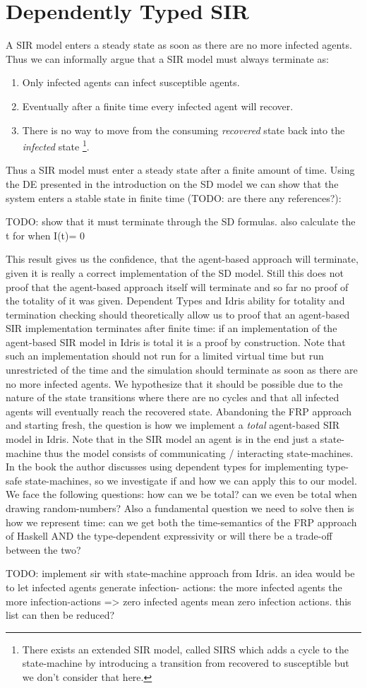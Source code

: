 \section{Dependently Typed SIR}
A SIR model enters a steady state as soon as there are no more infected agents. Thus we can informally argue that a SIR model must always terminate as:
\begin{enumerate}
	\item Only infected agents can infect susceptible agents.
	\item Eventually after a finite time every infected agent will recover.
	\item There is no way to move from the consuming \textit{recovered} state back into the \textit{infected} state \footnote{There exists an extended SIR model, called SIRS which adds a cycle to the state-machine by introducing a transition from recovered to susceptible but we don't consider that here.}.
\end{enumerate}

Thus a SIR model must enter a steady state after a finite amount of time. Using the DE presented in the introduction on the SD model we can show that the system enters a stable state in finite time (TODO: are there any references?):

TODO: show that it must terminate through the SD formulas. also calculate the t for when I(t)= 0

This result gives us the confidence, that the agent-based approach will terminate, given it is really a correct implementation of the SD model. Still this does not proof that the agent-based approach itself will terminate and so far no proof of the totality of it was given. Dependent Types and Idris ability for totality and termination checking should theoretically allow us to proof that an agent-based SIR implementation terminates after finite time: if an implementation of the agent-based SIR model in Idris is total it is a proof by construction. Note that such an implementation should not run for a limited virtual time but run unrestricted of the time and the simulation should terminate as soon as there are no more infected agents. We hypothesize that it should be possible due to the nature of the state transitions where there are no cycles and that all infected agents will eventually reach the recovered state. 
Abandoning the FRP approach and starting fresh, the question is how we implement a \textit{total} agent-based SIR model in Idris. Note that in the SIR model an agent is in the end just a state-machine thus the model consists of communicating / interacting state-machines. In the book \cite{brady_type-driven_2017} the author discusses using dependent types for implementing type-safe state-machines, so we investigate if and how we can apply this to our model. We face the following questions: how can we be total? can we even be total when drawing random-numbers? Also a fundamental question we need to solve then is how we represent time: can we get both the time-semantics of the FRP approach of Haskell AND the type-dependent expressivity or will there be a trade-off between the two?

TODO: implement sir with state-machine approach from Idris. an idea would be to let infected agents generate infection- actions: the more infected agents the more infection-actions => zero infected agents mean zero infection actions. this list can then be reduced?